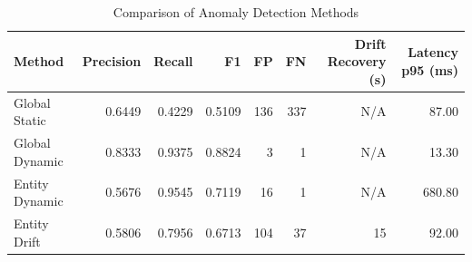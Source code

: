 \begin{table}[htbp]
\centering
\caption{Comparison of Anomaly Detection Methods}
\label{tab:comparison}
\begin{tabular}{lrrrrrrr}
\toprule
\textbf{Method} & \textbf{Precision} & \textbf{Recall} & \textbf{F1} & \textbf{FP} & \textbf{FN} & \textbf{Drift Recovery (s)} & \textbf{Latency p95 (ms)} \\
\midrule
Global Static & 0.6449 & 0.4229 & 0.5109 & 136 & 337 & N/A & 87.00 \\
Global Dynamic & 0.8333 & 0.9375 & 0.8824 & 3 & 1 & N/A & 13.30 \\
Entity Dynamic & 0.5676 & 0.9545 & 0.7119 & 16 & 1 & N/A & 680.80 \\
Entity Drift & 0.5806 & 0.7956 & 0.6713 & 104 & 37 & ~15 & 92.00 \\
\bottomrule
\end{tabular}
\end{table}